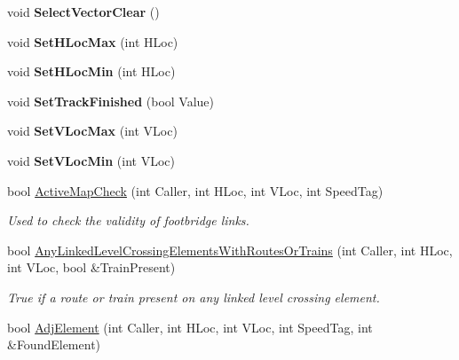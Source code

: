 \begin{DoxyCompactItemize}
\mbox{\label{class_t_track_a212b9df26c2d6653b841912cd4557b8f}} 
void {\bfseries Select\+Vector\+Clear} ()
\item 
\mbox{\label{class_t_track_a453e9074035359dc22be2b15913e4bab}} 
void {\bfseries Set\+H\+Loc\+Max} (int H\+Loc)
\item 
\mbox{\label{class_t_track_a30e9bd8b4f5e2fb3f01b8c94a98d79f3}} 
void {\bfseries Set\+H\+Loc\+Min} (int H\+Loc)
\item 
\mbox{\label{class_t_track_a98e6a381eec13868c31a28f450c1a361}} 
void {\bfseries Set\+Track\+Finished} (bool Value)
\item 
\mbox{\label{class_t_track_ad33eb8c757120a0fc52ba43c9c8a3293}} 
void {\bfseries Set\+V\+Loc\+Max} (int V\+Loc)
\item 
\mbox{\label{class_t_track_a6459d38cdb82ae38f54f4a1de4935e09}} 
void {\bfseries Set\+V\+Loc\+Min} (int V\+Loc)
\item 
\mbox{\label{class_t_track_a0b0e7c333d860841aed4b66b94a6a955}} 
bool \mbox{\hyperlink{class_t_track_a0b0e7c333d860841aed4b66b94a6a955}{Active\+Map\+Check}} (int Caller, int H\+Loc, int V\+Loc, int Speed\+Tag)
\begin{DoxyCompactList}\small\item\em Used to check the validity of footbridge links. \end{DoxyCompactList}\item 
\mbox{\label{class_t_track_a54678551db16086c8d269808884075d2}} 
bool \mbox{\hyperlink{class_t_track_a54678551db16086c8d269808884075d2}{Any\+Linked\+Level\+Crossing\+Elements\+With\+Routes\+Or\+Trains}} (int Caller, int H\+Loc, int V\+Loc, bool \&Train\+Present)
\begin{DoxyCompactList}\small\item\em True if a route or train present on any linked level crossing element. \end{DoxyCompactList}\item 
bool \mbox{\hyperlink{class_t_track_a607c6164af3158c328dd7c3ae25236c7}{Adj\+Element}} (int Caller, int H\+Loc, int V\+Loc, int Speed\+Tag, int \&Found\+Element)

\end{DoxyCompactItemize}
